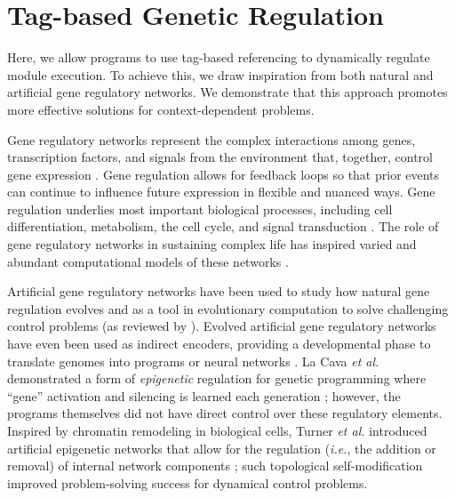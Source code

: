 \section{Tag-based Genetic Regulation}
\label{chapter:tag-based-regulation:sec:tag-based-genetic-regulation}

Here, we allow programs to use tag-based referencing to dynamically regulate module execution.
To achieve this, we draw inspiration from both natural and artificial gene regulatory networks. 
We demonstrate that this approach promotes more effective solutions for context-dependent problems.

Gene regulatory networks represent the complex interactions among genes, transcription factors, and signals from the environment that, together, control gene expression \citep{banzhaf_artificial_2015}.
Gene regulation allows for feedback loops so that prior events can continue to influence future expression in flexible and nuanced ways. 
Gene regulation underlies most important biological processes, including cell differentiation, metabolism, the cell cycle, and signal transduction \citep{karlebach_modelling_2008}.
The role of gene regulatory networks in sustaining complex life has inspired varied and abundant computational models of these networks \citep{cussat-blanc_artificial_2019,karlebach_modelling_2008}.

Artificial gene regulatory networks have been used to study how natural gene regulation evolves \citep{aldana_robustness_2007,crombach_evolution_2008,draghi_evolutionary_2009} and as a tool in evolutionary computation to solve challenging control problems (as reviewed by \citep{cussat-blanc_artificial_2019}).
Evolved artificial gene regulatory networks have even been used as indirect encoders, providing a developmental phase to translate genomes into programs \citep{banzhaf_artificial_2003,lopes_regulatory_2012} or neural networks \citep{kowaliw_using_2014}.
La Cava \textit{et al.} demonstrated a form of \textit{epigenetic} regulation for genetic programming where ``gene'' activation and silencing is learned each generation \citep{la_cava_genetic_2015,la_cava_inheritable_2015}; however, the programs themselves did not have direct control over these regulatory elements.
Inspired by chromatin remodeling in biological cells, Turner \textit{et al.} introduced artificial epigenetic networks that allow for the regulation (\textit{i.e.}, the addition or removal) of internal network components  \citep{turner_artificial_2017}; such topological self-modification improved problem-solving success for dynamical control problems.

